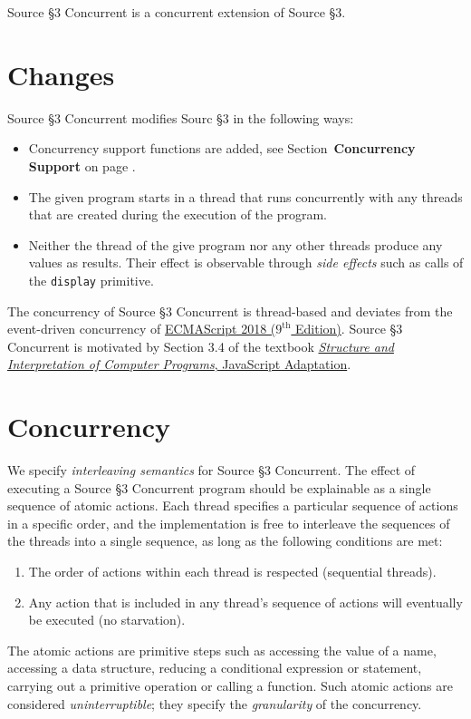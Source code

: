 





Source \S 3 Concurrent is a concurrent extension of Source \S 3.

\section*{Changes}

Source \S 3 Concurrent modifies Sourc \S 3 in the following ways:
\begin{itemize}
\item Concurrency support functions are added, see Section~\textbf{Concurrency Support} on page \pageref{conc_supp}.
\item The given program starts in a thread that runs concurrently with any
  threads that are created during the execution of the program.
\item Neither the thread of the give program nor any other threads produce
  any values as results. Their effect is observable through \emph{side effects}
  such as calls of the \lstinline{display} primitive.
\end{itemize}
\noindent
The concurrency of Source \S 3 Concurrent is thread-based and deviates
from the event-driven concurrency of  
\href{http://www.ecma-international.org/publications/files/ECMA-ST/Ecma-262.pdf}{\color{DarkBlue}
  ECMAScript 2018 ($9^{\textrm{th}}$ Edition)}. Source \S 3 Concurrent is
motivated by Section 3.4 of the textbook
\href{https://sicp.comp.nus.edu.sg}{\color{DarkBlue}\emph{Structure and Interpretation
of Computer Programs}, JavaScript Adaptation}.

\section*{Concurrency}

We specify \emph{interleaving semantics} for Source \S 3 Concurrent.
The effect of executing a Source \S 3 Concurrent program
should be explainable as a single sequence of atomic actions. Each thread
specifies a particular sequence of actions in a specific order,
and the implementation is free to interleave the sequences of the threads
into a single sequence, as long as the following conditions are met:
\begin{enumerate}
\item The order of actions within each thread is respected (sequential
  threads).
\item Any action that is included in any thread's sequence of actions will
  eventually be executed (no starvation).
\end{enumerate}
\noindent
The atomic actions are primitive steps such as accessing the value of a name,
accessing a data structure, reducing a conditional expression or statement,
carrying out a primitive operation or calling a function. Such atomic actions
are considered \emph{uninterruptible}; they specify the \emph{granularity}
of the concurrency.

